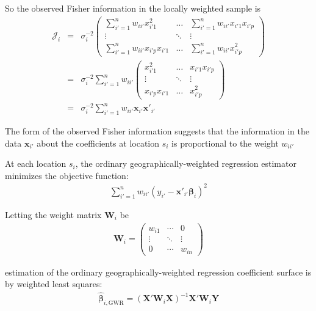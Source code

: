 \documentclass[authoryear, review, 11pt]{elsarticle}
\begin{document}
	So the observed Fisher information in the locally weighted sample is
	\begin{eqnarray}
		\bm{\mathcal{J}}_i &=& \sigma^{-2}_i \left( \begin{array}{ccc} \sum_{i'=1}^n  w_{ii'} x^2_{i'1}   & \dots & \sum_{i'=1}^n w_{ii'} x_{i'1} x_{i'p}   \\ \vdots & \ddots & \vdots \\ \sum_{i'=1}^n  w_{ii'} x_{i'p} x_{i'1}    & \dots & \sum_{i'=1}^n  w_{ii'} x^2_{i'p}  \end{array} \right) \\
		&=& \sigma^{-2}_i \sum_{i'=1}^n w_{ii'}\left( \begin{array}{ccc}  x^2_{i'1} & \dots & x_{i'1} x_{i'p} \\ \vdots & \ddots & \vdots \\ x_{i'p} x_{i'1} & \dots &  x^2_{i'p} \end{array} \right) \\
		&=& \sigma^{-2}_i \sum_{i'=1}^n w_{ii'} \bm{x}_{i'} \bm{x}'_{i'}
	\end{eqnarray}	
	
	The form of the observed Fisher information suggests that the information in the data $\bm{x}_{i'}$ about the coefficients at location $s_i$ is proportional to the weight $w_{ii'}$
	
	At each location $s_i$, the ordinary geographically-weighted regression estimator minimizes the objective function:
	\begin{eqnarray}
		\sum_{i'=1}^n w_{ii'} \left(y_{i'} - \bm{x}'_{i'} \bm{\beta}_i \right)^2
	\end{eqnarray}
	
	Letting the weight matrix $\bm{W}_i$ be	
	\begin{eqnarray}
		\bm{W}_i =  \left( \begin{array}{ccc} w_{i1} & \cdots & 0 \\ \vdots & \ddots & \vdots \\ 0 & \cdots & w_{in} \end{array} \right)
	\end{eqnarray}
	
	estimation of the ordinary geographically-weighted regression coefficient surface is by weighted least squares:	
	\begin{eqnarray}
		\hat{\bm{\beta}}_{i, \mbox{GWR}} = \left( \bm{X}'\bm{W}_i\bm{X} \right)^{-1} \bm{X}'\bm{W}_i\bm{Y}
	\end{eqnarray}
	
\end{document}
